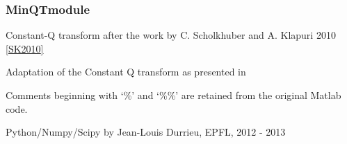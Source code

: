 \documentclass[letterpaper,10pt,english]{sphinxmanual}
\begin{document}
\subsubsection{MinQTmodule}
\label{reference/tftransforms:minqtmodule}\label{reference/tftransforms:module-pyfasst.tftransforms.minqt}
Constant-Q transform after the work by C. Scholkhuber and A. Klapuri
2010 {\hyperref[reference/tftransforms:sk2010]{{[}SK2010{]}}}

Adaptation of the Constant Q transform as presented in

Comments beginning with `\%' and `\%\%' are retained from the original Matlab
code.

Python/Numpy/Scipy by
Jean-Louis Durrieu, EPFL, 2012 - 2013
\end{document}
